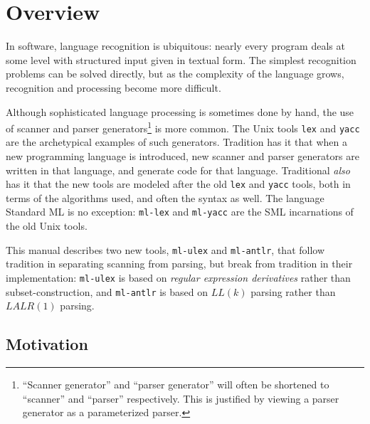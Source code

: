 \chapter{Overview}\label{chap:overview}

In software, language recognition is ubiquitous: nearly every program deals at some level with structured input given in textual form.  The simplest recognition problems can be solved directly, but as the complexity of the language grows, recognition and processing become more difficult.  

Although sophisticated language processing is sometimes done by hand, the use of scanner and parser generators\footnote{
  ``Scanner generator'' and ``parser generator'' will often be shortened to ``scanner'' and ``parser'' respectively.  This is justified by viewing a parser generator as a parameterized parser.
} is more common.  The Unix tools {\tt lex} and {\tt yacc} are the archetypical examples of such generators.  Tradition has it that when a new programming language is introduced, new scanner and parser generators are written in that language, and generate code for that language.  Traditional \emph{also} has it that the new tools are modeled after the old {\tt lex} and {\tt yacc} tools, both in terms of the algorithms used, and often the syntax as well.  The language Standard ML is no exception: {\tt ml-lex} and {\tt ml-yacc} are the SML incarnations of the old Unix tools.

This manual describes two new tools, {\tt ml-ulex} and {\tt ml-antlr}, that follow tradition in separating scanning from parsing, but break from tradition in their implementation: {\tt ml-ulex} is based on \emph{regular expression derivatives} rather than subset-construction, and {\tt ml-antlr} is based on $LL(k)$ parsing rather than $LALR(1)$ parsing.   

\section{Motivation}

